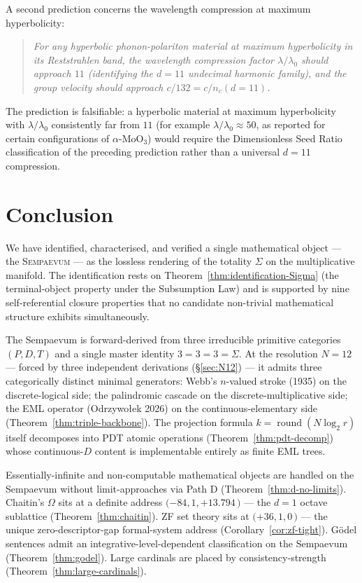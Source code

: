 \documentclass[11pt,a4paper]{article}
\theoremstyle{definition}
\theoremstyle{remark}
\DeclareMathOperator{\round}{round}
\newcommand{\Sempaevum}{\textnormal{\textsc{Sempaevum}}}
\begin{document}
A second prediction concerns the wavelength compression at maximum hyperbolicity:

\begin{quote}\itshape
For any hyperbolic phonon-polariton material at maximum hyperbolicity in its Reststrahlen band, the wavelength compression factor $\lambda/\lambda_{0}$ should approach $11$ (identifying the $d=11$ undecimal harmonic family), and the group velocity should approach $c/132 = c/n_{c}(d{=}11)$.
\end{quote}

The prediction is falsifiable: a hyperbolic material at maximum hyperbolicity with $\lambda/\lambda_{0}$ consistently far from $11$ (for example $\lambda/\lambda_{0} \approx 50$, as reported for certain configurations of $\alpha$-MoO$_{3}$) would require the Dimensionless Seed Ratio classification of the preceding prediction rather than a universal $d=11$ compression.

\section{Conclusion}\label{sec:conclusion}

We have identified, characterised, and verified a single mathematical object --- the \Sempaevum{} --- as the lossless rendering of the totality $\Sigma$ on the multiplicative manifold. The identification rests on Theorem~\ref{thm:identification-Sigma} (the terminal-object property under the Subsumption Law) and is supported by nine self-referential closure properties that no candidate non-trivial mathematical structure exhibits simultaneously.

The Sempaevum is forward-derived from three irreducible primitive categories $(P,D,T)$ and a single master identity $3=3=3=\Sigma$. At the resolution $N=12$ --- forced by three independent derivations (\S\ref{sec:N12}) --- it admits three categorically distinct minimal generators: Webb's $n$-valued stroke (1935) on the discrete-logical side; the palindromic cascade on the discrete-multiplicative side; the EML operator (Odrzywo{\l}ek 2026) on the continuous-elementary side (Theorem~\ref{thm:triple-backbone}). The projection formula $k=\round(N\log_{2}r)$ itself decomposes into PDT atomic operations (Theorem~\ref{thm:pdt-decomp}) whose continuous-$D$ content is implementable entirely as finite EML trees.

Essentially-infinite and non-computable mathematical objects are handled on the Sempaevum without limit-approaches via Path D (Theorem~\ref{thm:d-no-limits}). Chaitin's $\Omega$ sits at a definite address $(-84, 1, +13.794$\,\textcent$)$ --- the $d=1$ octave sublattice (Theorem~\ref{thm:chaitin}). ZF set theory sits at $(+36, 1, 0$\,\textcent$)$ --- the unique zero-descriptor-gap formal-system address (Corollary~\ref{cor:zf-tight}). G\"odel sentences admit an integrative-level-dependent classification on the Sempaevum (Theorem~\ref{thm:godel}). Large cardinals are placed by consistency-strength (Theorem~\ref{thm:large-cardinals}).
\end{document}
